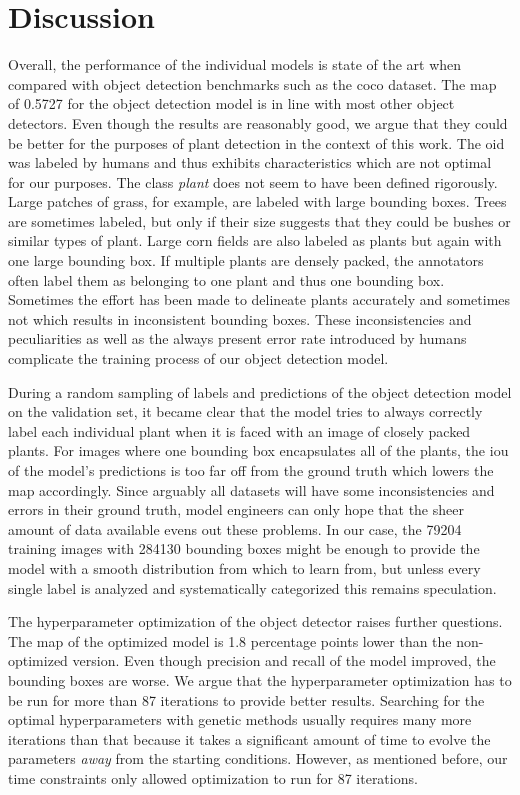 \documentclass[final]{vutinfth} %
\begin{document}
\section{Discussion}
\label{sec:discussion}

Overall, the performance of the individual models is state of the art
when compared with object detection benchmarks such as the \gls{coco}
dataset. The \gls{map} of \num{0.5727} for the object detection model
is in line with most other object detectors. Even though the results
are reasonably good, we argue that they could be better for the
purposes of plant detection in the context of this work. The \gls{oid}
was labeled by humans and thus exhibits characteristics which are not
optimal for our purposes. The class \emph{plant} does not seem to have
been defined rigorously. Large patches of grass, for example, are
labeled with large bounding boxes. Trees are sometimes labeled, but
only if their size suggests that they could be bushes or similar types
of plant. Large corn fields are also labeled as plants but again with
one large bounding box. If multiple plants are densely packed, the
annotators often label them as belonging to one plant and thus one
bounding box. Sometimes the effort has been made to delineate plants
accurately and sometimes not which results in inconsistent bounding
boxes. These inconsistencies and peculiarities as well as the always
present error rate introduced by humans complicate the training
process of our object detection model.

During a random sampling of labels and predictions of the object
detection model on the validation set, it became clear that the model
tries to always correctly label each individual plant when it is faced
with an image of closely packed plants. For images where one bounding
box encapsulates all of the plants, the \gls{iou} of the model's
predictions is too far off from the ground truth which lowers the
\gls{map} accordingly. Since arguably all datasets will have some
inconsistencies and errors in their ground truth, model engineers can
only hope that the sheer amount of data available evens out these
problems. In our case, the \num{79204} training images with
\num{284130} bounding boxes might be enough to provide the model with
a smooth distribution from which to learn from, but unless every
single label is analyzed and systematically categorized this remains
speculation.

The hyperparameter optimization of the object detector raises further
questions. The \gls{map} of the optimized model is \num{1.8}
percentage points lower than the non-optimized version. Even though
precision and recall of the model improved, the bounding boxes are
worse. We argue that the hyperparameter optimization has to be run for
more than \num{87} iterations to provide better results. Searching for
the optimal hyperparameters with genetic methods usually requires many
more iterations than that because it takes a significant amount of
time to evolve the parameters \emph{away} from the starting
conditions. However, as mentioned before, our time constraints only
allowed optimization to run for \num{87} iterations.
\end{document}
